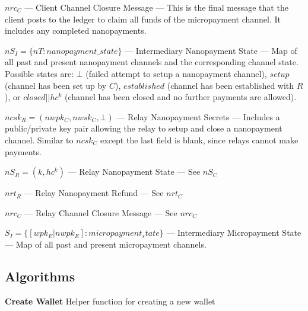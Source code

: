 $nrc_C$ --- Client Channel Closure Message --- This is the final message that the client posts to the ledger to claim all funds of the micropayment channel.
It includes any completed nanopayments.

$nS_I = \{nT: nanopayment\_state\}$ --- Intermediary Nanopayment State --- Map of all past and present nanopayment channels and the corresponding channel state.
Possible states are: $\bot$ (failed attempt to setup a nanopayment channel), $setup$ (channel has been set up by $C$), $established$ (channel has been established with $R$), or $closed||hc^k$ (channel has been closed and no further payments are allowed).

$ncsk_R = (nwpk_C, nwsk_C, \bot)$ --- Relay Nanopayment Secrets --- Includes a public/private key pair allowing the relay to setup and close a nanopayment channel.
Similar to $ncsk_C$ except the last field is blank, since relays cannot make payments.

$nS_R = (k, hc^k)$ --- Relay Nanopayment State --- See $nS_C$

$nrt_R$ --- Relay Nanopayment Refund --- See $nrt_C$

$nrc_C$ --- Relay Channel Closure Message --- See $nrc_C$

$S_I = \{ [wpk_E | nwpk_E] : micropayment_state\}$ --- Intermediary Micropayment State --- Map of all past and present micropayment channels.

\subsection{Algorithms}
\begin{algorithm}
  \caption[Create Wallet]{\textbf{Create Wallet} Helper function for creating a new wallet}
  \begin{algorithmic}[1]
    \State{\Return{$(wsk', wpk', wCom', \pi)$}
    \EndFunction{}
  \end{algorithmic}
\end{algorithm}


